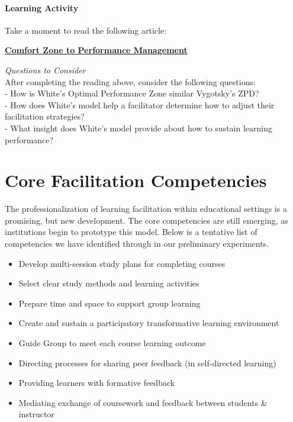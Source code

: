 \documentclass[
]{book}
\providecommand{\tightlist}{%
  \setlength{\itemsep}{0pt}\setlength{\parskip}{0pt}}
\begin{document}
\begin{reflect}
\hypertarget{learning-activity}{%
\paragraph*{Learning Activity}\label{learning-activity}}

Take a moment to read the following article:

\href{https://www.researchgate.net/publication/228957278_From_Comfort_Zone_to_Performance_Management}{\textbf{Comfort
Zone to Performance Management}}

\emph{Questions to Consider}\\
After completing the reading above, consider the following questions:\\
- How is White's Optimal Performance Zone similar Vygotsky's ZPD?\\
- How does White's model help a facilitator determine how to adjust
their facilitation strategies?\\
- What insight does White's model provide about how to sustain learning
performance?
\end{reflect}

\hypertarget{core-facilitation-competencies}{%
\section{Core Facilitation Competencies}\label{core-facilitation-competencies}}

The professionalization of learning facilitation within educational settings is a promising, but new development. The core competencies are still emerging, as institutions begin to prototype this model. Below is a tentative list of competencies we have identified through in our preliminary experiments.

\begin{itemize}
\tightlist
\item
  Develop multi-session study plans for completing courses
\item
  Select clear study methods and learning activities
\item
  Prepare time and space to support group learning
\item
  Create and sustain a participatory transformative learning environment
\item
  Guide Group to meet each course learning outcome
\item
  Directing processes for sharing peer feedback (in self-directed learning)
\item
  Providing learners with formative feedback
\item
  Mediating exchange of coursework and feedback between students \& instructor
\end{itemize}
\end{document}
